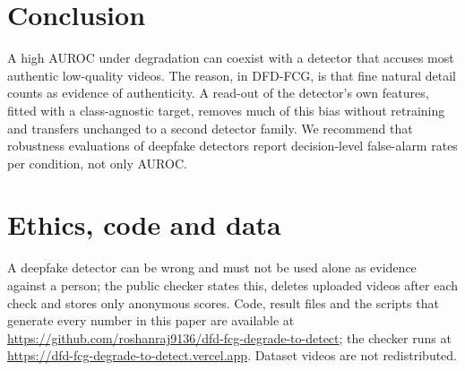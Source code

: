 \documentclass[11pt]{article}
\begin{document}
\section{Conclusion}
A high AUROC under degradation can coexist with a detector that accuses most authentic low-quality videos. The
reason, in DFD-FCG, is that fine natural detail counts as evidence of authenticity. A read-out of the detector's own
features, fitted with a class-agnostic target, removes much of this bias without retraining and transfers unchanged
to a second detector family. We recommend that robustness evaluations of deepfake detectors report decision-level
false-alarm rates per condition, not only AUROC.

\section*{Ethics, code and data}
A deepfake detector can be wrong and must not be used alone as evidence against a person; the public checker states
this, deletes uploaded videos after each check and stores only anonymous scores. Code, result files and the scripts
that generate every number in this paper are available at
\url{https://github.com/roshanraj9136/dfd-fcg-degrade-to-detect}; the checker runs at
\url{https://dfd-fcg-degrade-to-detect.vercel.app}. Dataset videos are not redistributed.



\end{document}
